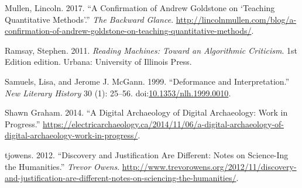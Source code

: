 \documentclass[english,]{book}
\begin{document}
\hypertarget{ref-mullen_confirmation_2017}{}
Mullen, Lincoln. 2017. ``A Confirmation of Andrew Goldstone on `Teaching
Quantitative Methods'.'' \emph{The Backward Glance}.
\url{http://lincolnmullen.com/blog/a-confirmation-of-andrew-goldstone-on-teaching-quantitative-methods/}.

\hypertarget{ref-ramsay_reading_2011}{}
Ramsay, Stephen. 2011. \emph{Reading Machines: Toward an Algorithmic
Criticism}. 1st Edition edition. Urbana: University of Illinois Press.

\hypertarget{ref-samuels_deformance_1999}{}
Samuels, Lisa, and Jerome J. McGann. 1999. ``Deformance and
Interpretation.'' \emph{New Literary History} 30 (1): 25--56.
doi:\href{https://doi.org/10.1353/nlh.1999.0010}{10.1353/nlh.1999.0010}.

\hypertarget{ref-shawn_graham_digital_2014}{}
Shawn Graham. 2014. ``A Digital Archaeology of Digital Archaeology: Work
in Progress.''
\url{https://electricarchaeology.ca/2014/11/06/a-digital-archaeology-of-digital-archaeology-work-in-progress/}.

\hypertarget{ref-tjowens_discovery_2012}{}
tjowens. 2012. ``Discovery and Justification Are Different: Notes on
Science-Ing the Humanities.'' \emph{Trevor Owens}.
\url{http://www.trevorowens.org/2012/11/discovery-and-justification-are-different-notes-on-sciencing-the-humanities/}.
\end{document}
